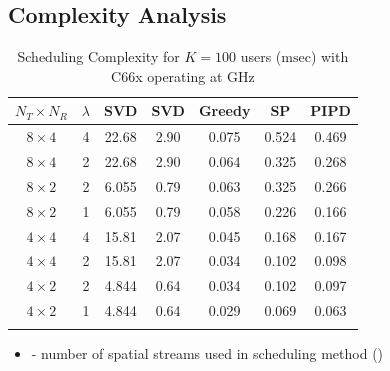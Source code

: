\documentclass[11pt]{beamer}
\begin{document}
\subsection{Complexity Analysis}

\begin{frame}
\begin{table} \caption{Scheduling Complexity for $K = 100$ users ($\mathrm{msec}$) with C66x operating at GHz} \begin{center} \begin{tabular}{c c c c c c c}
			$N_T \times N_R $ & $\lambda$ & SVD \eqn{(1)} & SVD \eqn{(8)} & Greedy   & SP          & PIPD \\ 
			\hline
			$8 \times 4$ & 4 & 22.68 & 2.90 & 0.075 & 0.524 & 0.469 \\ 
			$8 \times 4$ & 2 & 22.68 & 2.90 & 0.064 & 0.325 & 0.268 \\
			$8 \times 2$ & 2 & 6.055 & 0.79 & 0.063 & 0.325 & 0.266 \\
			$8 \times 2$ & 1 & 6.055 & 0.79 & 0.058 & 0.226 & 0.166 \\
			\hline
			$4 \times 4$ & 4 & 15.81 & 2.07 & 0.045 & 0.168 & 0.167 \\ 
			$4 \times 4$ & 2 & 15.81 & 2.07 & 0.034 & 0.102 & 0.098 \\
			$4 \times 2$ & 2 & 4.844 & 0.64 & 0.034 & 0.102 & 0.097 \\
			$4 \times 2$ & 1 & 4.844 & 0.64 & 0.029 & 0.069 & 0.063 \\
			\hline \vspace{-0.3in}
		\end{tabular} \label{table:compexity_comparison}\end{center}
\end{table}
\begin{itemize}
	\item \redtxt{\eqn{\lambda}} - number of spatial streams used in scheduling method ()
\end{itemize}
\end{frame}
\end{document}
